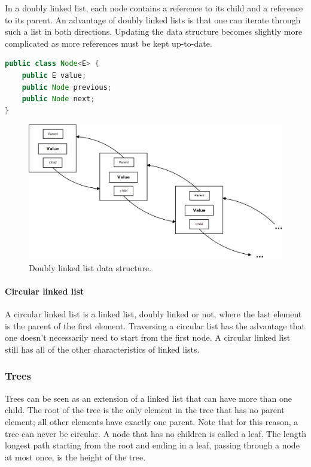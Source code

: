 In a doubly linked list, each node contains a reference to its child and a reference to its parent. An advantage of doubly linked lists is that one can iterate through such a list in both directions. Updating the data structure becomes slightly more complicated as more references must be kept up-to-date.

\begin{lstlisting}[language=java, caption=Node implementation for a doubly linked list., label=listing:node-doubly-linked-list]
public class Node<E> {
	public E value;
	public Node previous;
	public Node next;
}
\end{lstlisting}

\begin{figure}[H]
	\begin{center}
		\includegraphics[width=0.7\columnwidth]{img/programming-fundamentals/doubly-linked-list}
		\caption{Doubly linked list data structure.}
		\label{fig:doubly-linked-list}
	\end{center}
\end{figure}


\paragraph{Circular linked list}

A circular linked list is a linked list, doubly linked or not, where the last element is the parent of the first element. Traversing a circular list has the advantage that one doesn't necessarily need to start from the first node. A circular linked list still has all of the other characteristics of linked lists.



\subsubsection{Trees}

Trees can be seen as an extension of a linked list that can have more than one child. The root of the tree is the only element in the tree that has no parent element; all other elements have exactly one parent. Note that for this reason, a tree can never be circular. A node that has no children is called a leaf. The length longest path starting from the root and ending in a leaf, passing through a node at most once, is the height of the tree.


